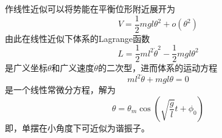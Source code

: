 \begin{example}[单摆]
作线性近似可以将势能在平衡位形附近展开为
\begin{equation*}
	V = \frac12 mgl\theta^2 + o(\theta^2)
\end{equation*}
由此在线性近似下体系的Lagrange函数
\begin{equation*}
	L = \frac12 ml^2 \dot{\theta}^2 - \frac12 mgl\theta^2 
\end{equation*}
是广义坐标$\theta$和广义速度$\dot{\theta}$的二次型，进而体系的运动方程
\begin{equation*}
	ml^2\ddot{\theta} + mgl\theta = 0
\end{equation*}
是一个线性常微分方程，解为
\begin{equation*}
	\theta = \theta_m \cos \left(\sqrt{\frac{g}{l}} t + \phi_0\right)
\end{equation*}
即，单摆在小角度下可近似为谐振子。
\end{example}


